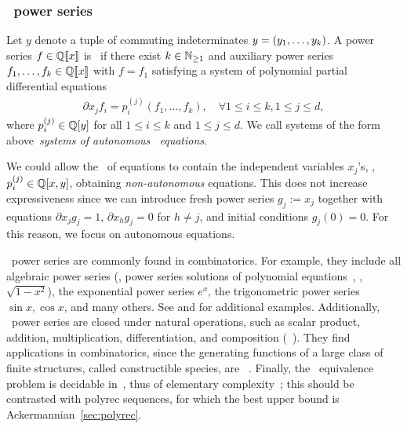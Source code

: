 \subsubsection{\CDA~power series}
\label{sec:CDA}

Let $y$ denote a tuple of commuting indeterminates $y = (y_1, \dots, y_k)$.
%
A power series $f \in \mathbb Q[\![x]\!]$ is~\CDA\-
\cite{BergeronReutenauer:EJC:1990,BergeronSattler:TCS:1995}
if there exist $k \in \mathbb N_{\geq 1}$
and auxiliary power series $f_1, \dots, f_k \in \mathbb Q[\![x]\!]$ with $f = f_1$
satisfying a system of polynomial partial differential equations
%
\begin{align}
    \label{eq:CDA}
    \partial {x_j} f_i
        = p^{(j)}_i(f_1, \dots, f_k),
        \quad \forall 1 \leq i \leq k, 1 \leq j \leq d,
\end{align}
%
where $p^{(j)}_i \in \mathbb Q[y]$
for all $1 \leq i \leq k$ and $1 \leq j \leq d$.
%
We call systems of the form above~\emph{systems of autonomous \CDA~equations}.
%
\begin{remark}
    \label{rem:nonautonomous CDA}
    We could allow the \rhs~of equations to contain the independent variables $x_j$'s,
    \ie, $p^{(j)}_i \in \mathbb Q[x, y]$,
    obtaining \emph{non-autonomous} equations.
    This does not increase expressiveness
    since we can introduce fresh power series $g_j := x_j$
    together with equations $\partial {x_j} g_j = 1$,
    $\partial {x_h} g_j = 0$ for $h \neq j$,
    and initial conditions $g_j(0) = 0$.
    For this reason, we focus on autonomous equations.
\end{remark}
%
\noindent
\CDA~power series are commonly found in combinatorics.
For example, they include all algebraic power series
(\ie, power series solutions of polynomial equations~\cite[Chapter III.16]{KuichSalomaa:1986},
\eg, $\sqrt{1 - x^2}$),
the exponential power series $e^x$,
the trigonometric power series $\sin x, \cos x$, and many others.
%
See \cite{BergeronReutenauer:EJC:1990,BergeronSattler:TCS:1995} and \cite[Sec.~3]{Clemente:CONCUR:2024}
for additional examples.
%
Additionally, \CDA~power series are closed under natural operations,
such as scalar product, addition, multiplication, differentiation, and composition
(\cf~\cite[Lemma 21]{Clemente:CONCUR:2024}).
%
They find applications in combinatorics,
since the generating functions of a large class of finite structures,
called constructible species, are \CDA~\cite[Theorem 31]{Clemente:CONCUR:2024}.
%
Finally, the \CDA~equivalence problem is decidable in~\TWOEXPTIME,
thus of elementary complexity~\cite[Theorem 3]{Clemente:CONCUR:2024};
this should be contrasted with polyrec sequences,
for which the best upper bound is Ackermannian~\cref{sec:polyrec}.

